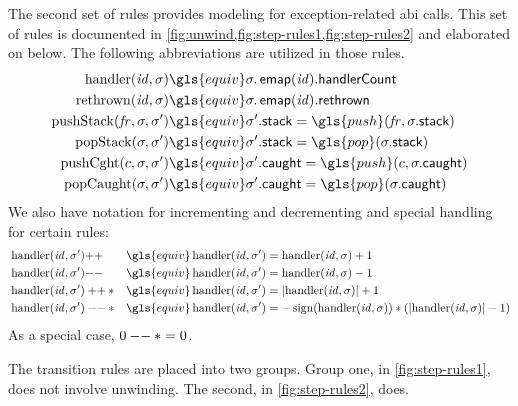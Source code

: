 The second set of rules provides modeling for exception-related \ac{abi} calls.
This set of rules is documented in \cref{fig:unwind,fig:step-rules1,fig:step-rules2} and elaborated on below.
The following abbreviations are utilized in those rules.
\begin{align}
  \handler(\id,\sigma) &\gls{equiv} \sigma.\emap(\id).\handlerCount \\
  \reth(\id,\sigma) &\gls{equiv} \sigma.\emap(\id).\rethrown \\
  \pushStack(\mathit{fr},\sigma,\sigma') &\gls{equiv} \sigma'.\stack=\gls{push}(\mathit{fr},\sigma.\stack) \\
  \popStack(\sigma,\sigma') &\gls{equiv} \sigma'.\stack=\gls{pop}(\sigma.\stack) \\
  \pushCaught(c,\sigma,\sigma') &\gls{equiv} \sigma'.\caught=\gls{push}(c,\sigma.\caught) \\
  \popCaught(\sigma,\sigma') &\gls{equiv} \sigma'.\caught=\gls{pop}(\sigma.\caught)
\end{align}
We also have notation for incrementing and decrementing and special handling for certain rules:
\begin{align}
  &\handler(\id,\sigma')\inc & \gls{equiv}\handler(\id,\sigma') &= \handler(\id,\sigma)+1 \\
  &\handler(\id,\sigma')\dec & \gls{equiv}\handler(\id,\sigma') &= \handler(\id,\sigma)-1 \\
  &\handler(\id,\sigma')\inc* & \gls{equiv}\handler(\id,\sigma') &= \abs{\handler(\id,\sigma)}+1 \\
  &\handler(\id,\sigma')\dec* & \gls{equiv}\handler(\id,\sigma') &= -\operatorname{sign}(\handler(\id,\sigma))*(\abs{\handler(\id,\sigma)}-1)
\end{align}
As a special case, $0\mathbin{--}*=0$.

The transition rules are placed into two groups.
Group one, in \cref{fig:step-rules1}, does not involve unwinding.
The second, in \cref{fig:step-rules2}, does.

